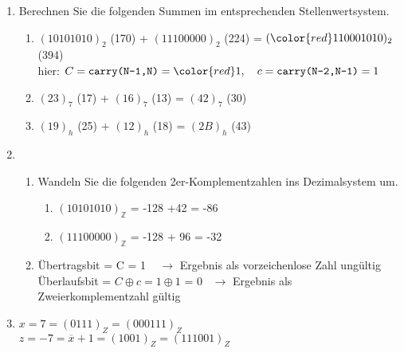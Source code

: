 \begin{enumerate}
	\item Berechnen Sie die folgenden Summen im entsprechenden Stellenwertsystem.
	\begin{enumerate}
		\item  $(10101010)_2$ (170) + $(11100000)_2$ (224) = $({\color{red}1}10001010)_2$  (394)\\
		hier: $C=\texttt{carry(N-1,N)}={\color{red}1},~~~ c=\texttt{carry(N-2,N-1)}=1$
		\item   $(23)_7$ (17) + $(16)_7$ (13) = $(42)_7$ (30)
		\item  $(19)_{h}$  (25) + $(12)_{h}$ (18) = $(2B)_{h}$ (43)
	\end{enumerate}
	\item 
	\begin{enumerate}
		\item Wandeln Sie die folgenden 2er-Komplementzahlen ins Dezimalsystem um.
		\begin{enumerate}
			\item  $(10101010)_{\mathbb{Z}}$ = -128 +42 = -86
			\item  $(11100000)_{\mathbb{Z}}$ = -128 + 96 = -32
		\end{enumerate}
		\item  Übertragsbit = C = {\color{red}1}  ~  $\rightarrow$ Ergebnis als vorzeichenlose Zahl ungültig \\
		 Überlaufsbit = $C \oplus c = 1 \oplus 1$ = 0~  $\rightarrow$ Ergebnis als Zweierkomplementzahl gültig 
	\end{enumerate}
	\item  $x = 7 = (0111)_Z = (000111)_Z$\\
	 $z = -7 = \overline{x}+1 = (1001)_Z = (111001)_Z$
\end{enumerate}
